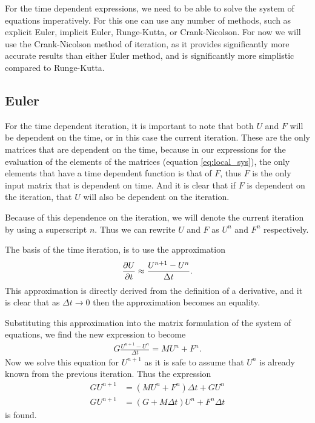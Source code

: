 \documentclass[../fem.tex]{subfile}
\begin{document}
For the time dependent expressions, we need to be able to solve the system of
equations imperatively. For this one can use any number of methods, such as
explicit Euler, implicit Euler, Runge-Kutta, or Crank-Nicolson. For now we
will use the Crank-Nicolson method of iteration, as it provides significantly
more accurate results than either Euler method, and is significantly more
simplistic compared to Runge-Kutta.

\subsection{Euler}%
\label{sub:euler}

For the time dependent iteration, it is important to note that both $U$ and $F$
will be dependent on the time, or in this case the current iteration. These are
the only matrices that are dependent on the time, because in our expressions
for the evaluation of the elements of the matrices (equation
\ref{eq:local_sys}), the only elements that have a time dependent function is
that of $F$, thus $F$ is the only input matrix that is dependent on time. And
it is clear that if $F$ is dependent on the iteration, that $U$ will also be
dependent on the iteration.

Because of this dependence on the iteration, we will denote the current
iteration by using a superscript $n$. Thus we can rewrite $U$ and $F$ as $U^n$
and $F^n$ respectively.

The basis of the time iteration, is to use the approximation
\begin{align*}
  \frac{\partial U}{\partial t}\approx\frac{U^{n+1}-U^n}{\Delta t}.
\end{align*}
This approximation is directly derived from the definition of a derivative, and
it is clear that as $\Delta t\rightarrow 0$ then the approximation becomes an
equality.

Substituting this approximation into the matrix formulation of the system of
equations, we find the new expression to become
\begin{align*}
  G\frac{U^{n+1}-U^n}{\Delta t}=MU^n+F^n.
\end{align*}
Now we solve this equation for $U^{n+1}$ as it is safe to assume that $U^n$ is
already known from the previous iteration. Thus the expression
\begin{align*}
  GU^{n+1}&=\left(MU^n+F^n\right)\Delta t+GU^n\\
  GU^{n+1}&=\left(G+M\Delta t\right)U^n+F^n\Delta t
\end{align*}
is found.
\end{document}
